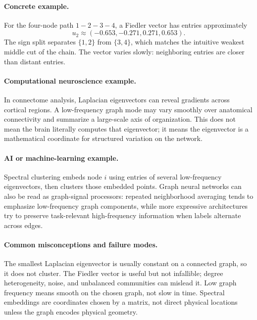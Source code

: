 \paragraph{Concrete example.}
For the four-node path \(1-2-3-4\), a Fiedler vector has entries approximately
\[
u_2\approx(-0.653,-0.271,0.271,0.653).
\]
The sign split separates \(\{1,2\}\) from \(\{3,4\}\), which matches the intuitive weakest middle cut of the chain. The vector varies slowly: neighboring entries are closer than distant entries.

\paragraph{Computational neuroscience example.}
In connectome analysis, Laplacian eigenvectors can reveal gradients across cortical regions. A low-frequency graph mode may vary smoothly over anatomical connectivity and summarize a large-scale axis of organization. This does not mean the brain literally computes that eigenvector; it means the eigenvector is a mathematical coordinate for structured variation on the network.

\paragraph{AI or machine-learning example.}
Spectral clustering embeds node \(i\) using entries of several low-frequency eigenvectors, then clusters those embedded points. Graph neural networks can also be read as graph-signal processors: repeated neighborhood averaging tends to emphasize low-frequency graph components, while more expressive architectures try to preserve task-relevant high-frequency information when labels alternate across edges.

\paragraph{Common misconceptions and failure modes.}
The smallest Laplacian eigenvector is usually constant on a connected graph, so it does not cluster. The Fiedler vector is useful but not infallible; degree heterogeneity, noise, and unbalanced communities can mislead it. Low graph frequency means smooth on the chosen graph, not slow in time. Spectral embeddings are coordinates chosen by a matrix, not direct physical locations unless the graph encodes physical geometry.

